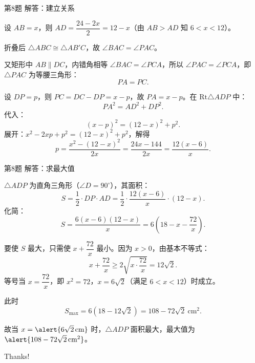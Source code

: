 \documentclass[10pt,aspectratio=169,serif]{beamer}
\begin{document}
\begin{frame}[t]{第8题 解答：建立关系}
\begin{tcolorbox}[colback=orange!10,colframe=orange,title=\textbf{解}]
设 $AB=x$，则 $AD=\dfrac{24-2x}{2}=12-x$（由 $AB>AD$ 知 $6<x<12$）。

折叠后 $\triangle ABC\cong\triangle AB'C$，故 $\angle BAC=\angle PAC$。

又矩形中 $AB\parallel DC$，内错角相等 $\angle BAC=\angle PCA$，所以 $\angle PAC=\angle PCA$，即 $\triangle PAC$ 为等腰三角形：
\[
PA=PC.
\]

设 $DP=p$，则 $PC=DC-DP=x-p$，故 $PA=x-p$。在 $\mathrm{Rt}\triangle ADP$ 中：
\[
PA^2=AD^2+DP^2.
\]
代入：
\[
(x-p)^2=(12-x)^2+p^2.
\]
展开：$x^2-2xp+p^2=(12-x)^2+p^2$，解得
\[
p=\frac{x^2-(12-x)^2}{2x}=\frac{24x-144}{2x}=\frac{12(x-6)}{x}.
\]
\end{tcolorbox}
\end{frame}

\begin{frame}[t]{第8题 解答：求最大值}
\begin{tcolorbox}[colback=orange!10,colframe=orange,title=\textbf{解 续}]
$\triangle ADP$ 为直角三角形（$\angle D=90^\circ$），其面积：
\[
S=\frac{1}{2}\cdot DP\cdot AD=\frac{1}{2}\cdot\frac{12(x-6)}{x}\cdot(12-x).
\]
化简：
\[
S=\frac{6(x-6)(12-x)}{x}=6\left(18-x-\frac{72}{x}\right).
\]

要使 $S$ 最大，只需使 $x+\dfrac{72}{x}$ 最小。因为 $x>0$，由基本不等式：
\[
x+\frac{72}{x}\ge 2\sqrt{x\cdot\frac{72}{x}}=12\sqrt{2}.
\]
等号当 $x=\dfrac{72}{x}$，即 $x^2=72$，$x=6\sqrt{2}$（满足 $6<x<12$）时成立。

此时
\[
S_{\max}=6(18-12\sqrt{2})=108-72\sqrt{2}\ \mathrm{cm^2}.
\]

\vspace{0.3em}
故当 $x=\alert{6\sqrt{2}\,\mathrm{cm}}$ 时，$\triangle ADP$ 面积最大，最大值为 $\alert{108-72\sqrt{2}\,\mathrm{cm^2}}$。
\end{tcolorbox}
\end{frame}

\begin{frame}[c]
  \begin{center}
    {\Huge\calligra Thanks!}
  \end{center}
\end{frame}
\end{document}
